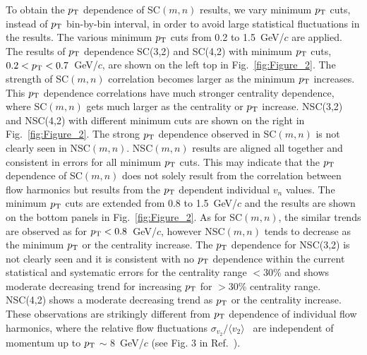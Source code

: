 \documentclass[ALICE,manyauthors]{cernphprep}
\begin{document}
To obtain the $p_{\rm T}$ dependence of SC$(m,n)$ results, we vary minimum $p_{\rm T}$ cuts, instead of $p_{\rm T}$ bin-by-bin interval, in order to avoid large statistical fluctuations in the results. The various minimum $p_{\rm T}$ cuts from 0.2 to 1.5~GeV/$c$ are applied.
The results of $p_{\rm T}$ dependence SC(3,2) and SC(4,2) with minimum $p_{\rm T}$ cuts, $0.2<p_{\rm T}<0.7$~GeV/$c$, are shown on the left top in Fig.~\ref{fig:Figure_2}.
The strength of SC$(m,n)$ correlation becomes larger as the minimum $p_{\rm T}$ increases. 
This $p_{\rm T}$ dependence correlations have much stronger centrality dependence, where SC$(m,n)$ gets much larger as the centrality or $p_{\rm T}$ increase. 
NSC(3,2) and NSC(4,2) with different minimum cuts are shown on the right in Fig.~\ref{fig:Figure_2}.
The strong $p_{\rm T}$ dependence observed in SC$(m,n)$ is not clearly seen in NSC$(m,n)$. NSC$(m,n)$ results are aligned all together and consistent in errors for all minimum $p_{\rm T}$ cuts. 
This may indicate that the $p_{\rm T}$ dependence of SC$(m,n)$ does not solely result from the correlation between flow harmonics but results from the $p_{\rm T}$  dependent individual $v_n$ values. 
The minimum $p_{\rm T}$ cuts are extended from 0.8  to 1.5~GeV/$c$ and the results are shown on the bottom panels in Fig.~\ref{fig:Figure_2}.
As for SC$(m,n)$, the similar trends are observed as for $p_{\rm T}<0.8$~GeV/$c$, however NSC$(m,n)$ tends to decrease as the minimum $p_{\rm T}$ or the centrality increase.
The $p_{\rm T}$ dependence for NSC(3,2) is not clearly seen and it is consistent with no $p_{\rm T}$ dependence within the current statistical and systematic errors for the centrality range $<$30\% and shows moderate decreasing trend for increasing $p_{\rm T}$ for $>$30\% centrality range.
NSC(4,2) shows a moderate decreasing trend as $p_{\rm T}$ or the centrality increase. These observations are strikingly different from $p_{\rm T}$ dependence of individual flow harmonics, where the relative flow fluctuations $\sigma_{v_2}/\langle v_{2} \rangle$~\cite{Voloshin:2008dg} are independent of momentum up to $p_{\rm T}$ $\sim$ 8~GeV/$c$ (see Fig. 3 in Ref.~\cite{Abelev:2012di}).
\end{document}
